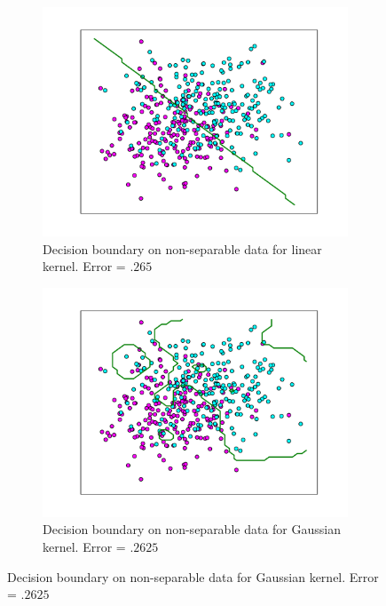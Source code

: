 \documentclass[10pt]{article}
\begin{document}
\begin{figure}[!ht]
\begin{subfigure}[b]{0.46\textwidth}
	\centering
	\includegraphics[width=\textwidth]{exercise2-3-stdev4-linear.pdf}
	\caption{Decision boundary on non-separable data for linear kernel. Error = $.265$}
	\label{fig:2-3-linear}
\end{subfigure}
\begin{subfigure}[b]{0.46\textwidth}
	\centering
	\includegraphics[width=\textwidth]{exercise2-3-stdev4-gaussian.pdf}
	\caption{Decision boundary on non-separable data for Gaussian kernel. Error = $.2625$}
	\label{fig:2-3-gaussian}
\end{subfigure}
\end{figure}
\end{document}
